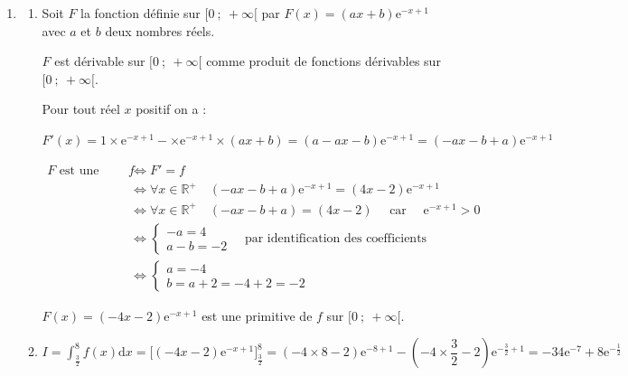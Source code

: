 \documentclass[10pt]{article}
\providecommand{\R}{\mathbb{R}}
\providecommand{\e}{{\mathrm{e}}}
\begin{document}
\begin{enumerate}
\begin{enumerate}
		\begin{center}
		\end{center}

		La fonction $f$ est donc concave sur $\left[0~;~\dfrac{5}{2}\right]$ et convexe sur $\left[\dfrac{5}{2}~;~+\infty\right[$.

		Le point A, d'abscisse  $\dfrac{5}{2}$ est un point d'inflexion de la courbe représentative de $f$.

		\end{enumerate}
	\item

	\begin{enumerate}
		\item  Soit $F$ la fonction définie sur $[0~;~+\infty[$ par $F(x)=(ax+b)\e^{-x+1}$ avec  $a$ et $b$ deux nombres réels.

		$F$  est dérivable sur $[0~;~+\infty[$ comme produit de fonctions dérivables sur $[0~;~+\infty[$.

		Pour tout réel $x$ positif on a :

		$F'(x)= 1 \times \e^{-x+1} - \times \e^{-x+1} \times (ax+b)= (a-ax-b)\e^{-x+1}= (-ax-b+a)\e^{-x+1}$

		$\begin{aligned} F\text{ est une primitive de }f &\iff F'=f\\
		&\iff \forall x \in \R^+ \quad  (-ax-b+a)\e^{-x+1}= (4x-2)\e^{-x+1} \\
		&\iff \forall x \in \R^+ \quad (-ax-b+a)= (4x-2) \quad \text{ car } \quad \e^{-x+1}>0 \\
		&\iff \begin{cases} -a=4 \\ a-b=-2 \end{cases} \quad\text{par identification des coefficients}\\
		&\iff \begin{cases} a=- 4 \\ b=a+2=-4+2=-2 \end{cases}\end{aligned}$

		$F(x)=(-4x-2)\e^{-x+1}$ est une primitive de $f$ sur $[0~;~+\infty[$.

		\item  $\displaystyle  I = \int_{\frac{3}{2}}^8 f(x) \mathrm{d} x = \Big[(-4x-2)\e^{-x+1} \Big]_{\frac{3}{2}}^8
		= (-4\times 8-2)\e^{-8+1} - \left(-4\times \dfrac{3}{2}-2\right)\e^{-\frac{3}{2}+1} = -34\e^{-7}+ 8\e^{-\frac{1}{2}}$


\end{enumerate}
\end{enumerate}
\end{document}
